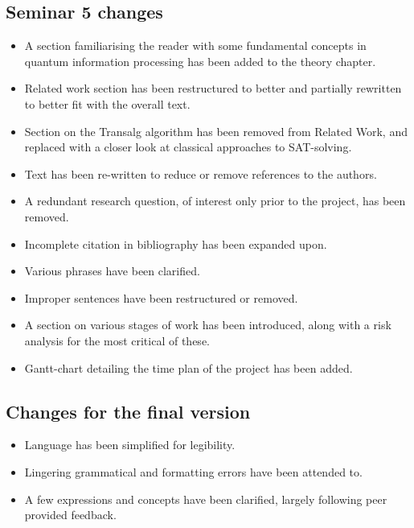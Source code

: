 \documentclass[msc,lith,english]{liuthesis}
\begin{document}
\subsection{Seminar 5 changes}
\begin{itemize}
    \item A section familiarising the reader with some fundamental concepts in quantum information processing has been added to the theory chapter.
    \item Related work section has been restructured to better and partially rewritten to better fit with the overall text.
    \item Section on the Transalg algorithm has been removed from Related Work, and replaced with a closer look at classical approaches to SAT-solving.
    \item Text has been re-written to reduce or remove references to the authors.
    \item A redundant research question, of interest only prior to the project, has been removed.
    \item Incomplete citation in bibliography has been expanded upon.
    \item Various phrases have been clarified.
    \item Improper sentences have been restructured or removed.
    \item A section on various stages of work has been introduced, along with a risk analysis for the most critical of these.
    \item Gantt-chart detailing the time plan of the project has been added.
\end{itemize}

\subsection{Changes for the final version}
\begin{itemize}
    \item Language has been simplified for legibility.
    \item Lingering grammatical and formatting errors have been attended to.
    \item A few expressions and concepts have been clarified, largely following peer provided feedback.
\end{itemize}

\printbibliography
\end{document}
